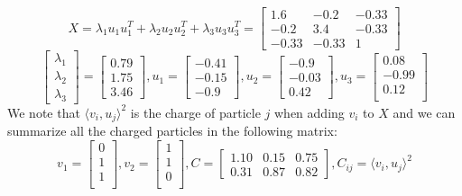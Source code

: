 \documentclass[
  letterpaper,
  DIV=11,
  numbers=noendperiod]{scrartcl}
\theoremstyle{plain}
\theoremstyle{plain}
\theoremstyle{plain}
\theoremstyle{definition}
\theoremstyle{plain}
\theoremstyle{remark}
\begin{document}
\[X = \lambda_1 u_1 u_1^T + \lambda_2 u_2 u_2^T + \lambda_3 u_3 u_3^T
 = \begin{bmatrix}
1.6 & -0.2 & -0.33\\
-0.2 & 3.4 & -0.33\\
-0.33 & -0.33 & 1
\end{bmatrix}\]
\[\begin{bmatrix}\lambda_1 \\ \lambda_2 \\ \lambda_3\end{bmatrix} = \begin{bmatrix}0.79 \\ 1.75 \\ 3.46\end{bmatrix}, u_1 = \begin{bmatrix}
-0.41\\
-0.15\\
-0.9
\end{bmatrix}, u_2 = \begin{bmatrix}
-0.9 \\
-0.03 \\
0.42
\end{bmatrix}, u_3 = \begin{bmatrix}
0.08\\
-0.99\\
0.12\\
\end{bmatrix}\] We note that \(\langle v_i, u_j \rangle^2\) is the
charge of particle \(j\) when adding \(v_i\) to \(X\) and we can
summarize all the charged particles in the following matrix:
\[v_1 = \begin{bmatrix}
0\\
1\\
1\\
\end{bmatrix}, v_2 = \begin{bmatrix}
1\\
1\\
0\\
\end{bmatrix}, 
C = \begin{bmatrix}
1.10 & 0.15 & 0.75\\
0.31 & 0.87 & 0.82
\end{bmatrix}, C_{ij} = \langle v_i, u_j \rangle^2\]
\end{document}
